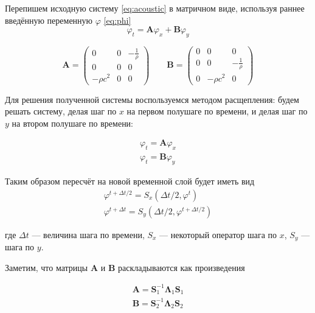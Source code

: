Перепишем исходную систему \eqref{eq:acoustic} в матричном виде, используя раннее введённую переменную $\varphi$ \eqref{eq:phi} 
\begin{equation}
	\varphi_t = \pmb{A} \varphi_x +  \pmb{B} \varphi_y
\end{equation}

\begin{equation}
	\pmb{A} = 
	\begin{pmatrix}
		0 & 0 & -\frac{1}{\rho} \\
		0 & 0 & 0 \\
		-\rho c^2 & 0 & 0			
 	 \end{pmatrix} \qquad
	\pmb{B} = 
	\begin{pmatrix}
		0 & 0 & 0 \\
		0 & 0 & -\frac{1}{\rho} \\
		0 & -\rho c^2 & 0			
    \end{pmatrix}
\end{equation}

Для решения полученной системы воспользуемся методом расщепления: будем решать систему, делая шаг по $x$ на первом полушаге по времени, и делая шаг по $y$ на втором полушаге по времени:

\begin{equation}
\begin{gathered}
	\varphi_t = \pmb{A} \varphi_x \\
	\varphi_t = \pmb{B} \varphi_y
\end{gathered}
\label{eq:syst_split}
\end{equation} 

Таким образом пересчёт на новой временной слой будет иметь вид
\begin{equation}
\begin{gathered}
		\varphi^{t+\Delta t / 2} = S_x(\Delta t / 2, \varphi^t)\\
		\varphi^{t+\Delta t}     = S_y(\Delta t / 2, \varphi^{t+\Delta t/2})
\end{gathered}
\label{eq:gcm_t_steps}
\end{equation} 

где $\Delta t$ --- величина шага по времени, $S_x$ --- некоторый  оператор шага по $x$, $S_y$ --- шага по $y$.

Заметим, что матрицы $\pmb{A}$ и $\pmb{B}$ раскладываются как произведения

\begin{gather}
		\pmb{A} = \pmb{S}_1^{-1} \pmb{\Lambda}_1 \pmb{S}_1\\
		\pmb{B} = \pmb{S}_2^{-1} \pmb{\Lambda}_2 \pmb{S}_2
\end{gather}

